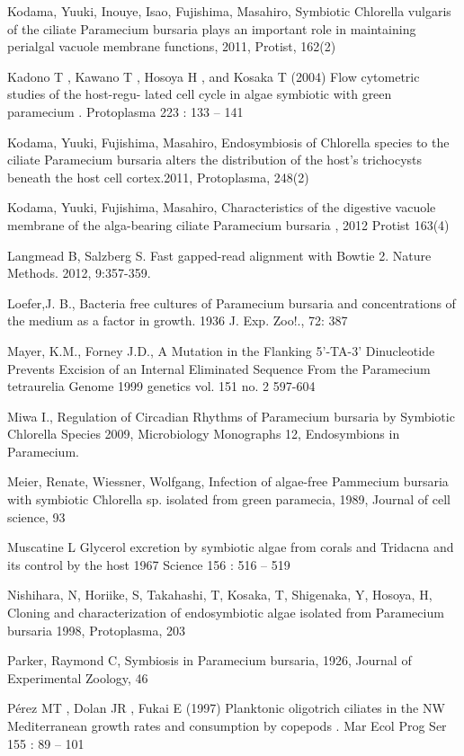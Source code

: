 \documentclass[a4paper,11pt]{article}
\begin{document}
 
\noindent Kodama, Yuuki, Inouye, Isao,  Fujishima, Masahiro, Symbiotic Chlorella vulgaris of the ciliate Paramecium bursaria plays an important role in maintaining perialgal vacuole membrane functions, 2011, Protist, 162(2)

 
\noindent Kadono T , Kawano T , Hosoya H , and Kosaka T (2004) Flow cytometric studies of the host-regu- lated cell cycle in algae symbiotic with green paramecium . Protoplasma 223 : 133 – 141

 
\noindent Kodama, Yuuki, Fujishima, Masahiro, Endosymbiosis of Chlorella species to the ciliate Paramecium bursaria alters the distribution of the host's trichocysts beneath the host cell cortex.2011, Protoplasma, 248(2)

 
\noindent Kodama, Yuuki,  Fujishima, Masahiro, Characteristics of the digestive vacuole membrane of the alga-bearing ciliate Paramecium bursaria , 2012  Protist 163(4)

 
\noindent Langmead B, Salzberg S. Fast gapped-read alignment with Bowtie 2. Nature Methods. 2012, 9:357-359.

 
\noindent Loefer,J. B., Bacteria free cultures of Paramecium bursaria and concentrations of the medium as a factor in growth. 1936 J. Exp. Zoo!., 72: 387

 
\noindent Mayer, K.M., Forney J.D., A Mutation in the Flanking 5'-TA-3' Dinucleotide Prevents Excision of an Internal Eliminated Sequence From the Paramecium tetraurelia Genome 1999 genetics vol. 151 no. 2 597-604

 
\noindent Miwa I., Regulation of Circadian Rhythms of Paramecium bursaria by Symbiotic Chlorella Species 2009, Microbiology Monographs 12, Endosymbions in Paramecium.

 
\noindent Meier, Renate, Wiessner, Wolfgang, Infection of algae-free Pammecium bursaria with symbiotic Chlorella sp. isolated from green paramecia, 1989, Journal of cell science, 93

 
\noindent Muscatine L Glycerol excretion by symbiotic algae from corals and Tridacna and its control by the host 1967  Science 156 : 516 – 519

 
\noindent Nishihara, N, Horiike, S,  Takahashi, T, Kosaka, T, Shigenaka, Y, Hosoya, H, Cloning and characterization of endosymbiotic algae isolated from Paramecium bursaria 1998, Protoplasma, 203

 
\noindent Parker, Raymond C, Symbiosis in Paramecium bursaria, 1926, Journal of Experimental Zoology,  46

 
\noindent Pérez MT , Dolan JR , Fukai E (1997) Planktonic oligotrich ciliates in the NW Mediterranean growth rates and consumption by copepods . Mar Ecol Prog Ser 155 : 89 – 101
\end{document}

